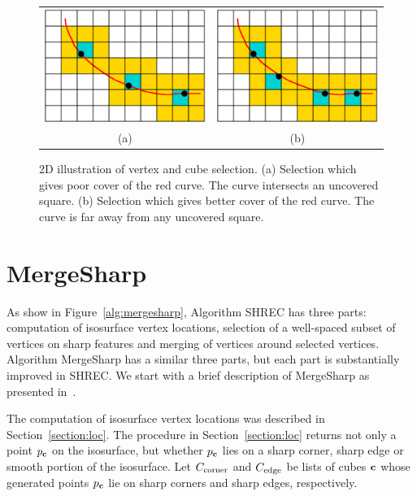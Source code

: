 \begin{figure}[t]
\centering

\begin{tabular}{cc}
\includegraphics[width=0.4\linewidth]{images/selectA.eps} \qquad &
\qquad
\includegraphics[width=0.4\linewidth]{images/selectB.eps} \\
(a) & (b)
\end{tabular}

\caption{2D illustration of vertex and cube selection.
(a) Selection which gives poor cover of the red curve.
The curve intersects an uncovered square.
(b) Selection which gives better cover of the red curve.
The curve is far away from any uncovered square.
}
\label{fig:select}
\end{figure}

\section{MergeSharp}

As show in Figure~\ref{alg:mergesharp}, Algorithm SHREC has three parts:
computation of isosurface vertex locations, 
selection of a well-spaced subset of vertices on sharp features
and merging of vertices around selected vertices.
Algorithm MergeSharp has a similar three parts,
but each part is substantially improved in SHREC.
We start with a brief description of MergeSharp
as presented in~\cite{bw-cisec-13}.

The computation of isosurface vertex locations
was described in Section~\ref{section:loc}.
The procedure in Section~\ref{section:loc}
returns not only a point $p_{\mathbf{c}}$ on the isosurface,
but whether $p_{\mathbf{c}}$ lies on a sharp corner, sharp edge or smooth portion 
of the isosurface.
Let $C_{\mathrm{corner}}$ and $C_{\mathrm{edge}}$ be lists of cubes $\mathbf{c}$ 
whose generated points $p_{\mathbf{c}}$ lie on sharp corners and sharp edges, 
respectively.

